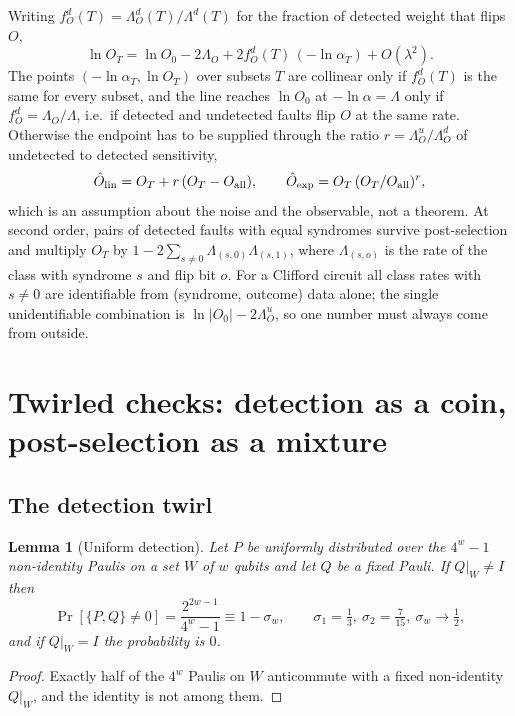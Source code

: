 \documentclass[11pt,a4paper]{article}
\newtheorem{lemma}{Lemma}
\theoremstyle{remark}
\newcommand{\all}{\mathrm{all}}
\begin{document}
Writing $f_O^d(T)=\Lambda_O^d(T)/\Lambda^d(T)$ for the fraction of detected weight that flips $O$,
\begin{equation}
\ln O_T=\ln O_0-2\Lambda_O+2f_O^d(T)\,(-\ln\alpha_T)+O(\lambda^2).
\end{equation}
The points $(-\ln\alpha_T,\ln O_T)$ over subsets $T$ are collinear only if $f_O^d(T)$ is the same for every subset, and the line reaches $\ln O_0$ at $-\ln\alpha=\Lambda$ only if $f_O^d=\Lambda_O/\Lambda$, i.e.\ if detected and undetected faults flip $O$ at the same rate. Otherwise the endpoint has to be supplied through the ratio $r=\Lambda_O^u/\Lambda_O^d$ of undetected to detected sensitivity,
\begin{equation}
\hat O_{\rm lin}=O_T+r\,(O_T-O_\all),\qquad \hat O_{\exp}=O_T\,(O_T/O_\all)^{r},
\label{eq:two-point}
\end{equation}
which is an assumption about the noise and the observable, not a theorem. At second order, pairs of detected faults with equal syndromes survive post-selection and multiply $O_T$ by $1-2\sum_{s\neq0}\Lambda_{(s,0)}\Lambda_{(s,1)}$, where $\Lambda_{(s,o)}$ is the rate of the class with syndrome $s$ and flip bit $o$. For a Clifford circuit all class rates with $s\neq0$ are identifiable from (syndrome, outcome) data alone; the single unidentifiable combination is $\ln|O_0|-2\Lambda_O^u$, so one number must always come from outside.

\section{Twirled checks: detection as a coin, post-selection as a mixture}
\label{sec:twirl}

\subsection{The detection twirl}

\begin{lemma}[Uniform detection]
\label{lem:coin}
Let $P$ be uniformly distributed over the $4^w-1$ non-identity Paulis on a set $W$ of $w$ qubits and let $Q$ be a fixed Pauli. If $Q|_W\neq I$ then
\begin{equation}
\Pr[\{P,Q\}\neq0]=\frac{2^{2w-1}}{4^w-1}\equiv1-\sigma_w,\qquad \sigma_1=\tfrac13,\ \sigma_2=\tfrac7{15},\ \sigma_w\to\tfrac12,
\end{equation}
and if $Q|_W=I$ the probability is $0$.
\end{lemma}
\begin{proof}
Exactly half of the $4^w$ Paulis on $W$ anticommute with a fixed non-identity $Q|_W$, and the identity is not among them.
\end{proof}
\end{document}
